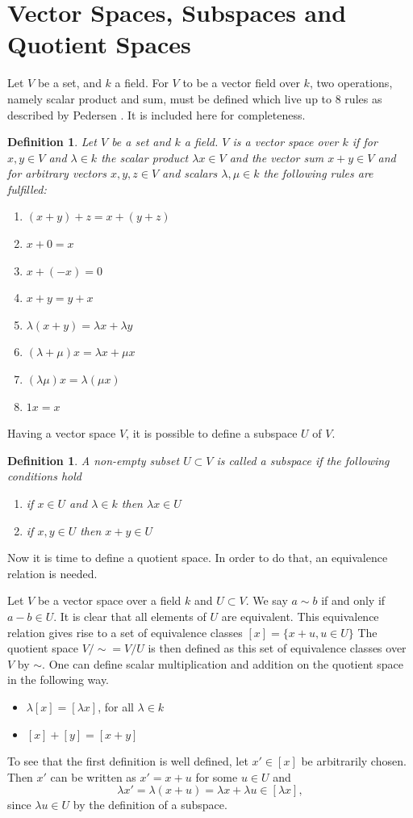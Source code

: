 \documentclass[11pt,a4paper,twoside]{report}
\newtheorem{mydef}[mythm]{Definition}
\begin{document}
\section{Vector Spaces, Subspaces and Quotient Spaces}
Let $V$ be a set, and $k$ a field. For $V$ to be a vector field over $k$, two operations, namely scalar product and sum, must be defined which live up to 8 rules as described by Pedersen \cite[pp. 85-86]{LinAlg}. It is included here for completeness.
\begin{mydef} 
Let $V$ be a set and $k$ a field. $V$ is a vector space over $k$ if for $x,y\in V$ and $\lambda\in k$ the scalar product $\lambda x\in V$ and the vector sum $x+y\in V$ and for arbitrary vectors $x,y,z\in V$ and scalars $\lambda,\mu\in k$ the following rules are fulfilled:
\begin{enumerate}
\item $(x+y)+z = x+(y+z)$
\item $x+0=x$
\item $x+(-x)=0$
\item $x+y=y+x$
\item $\lambda(x+y)=\lambda x+\lambda y$
\item $(\lambda+\mu)x=\lambda x + \mu x$
\item $(\lambda\mu)x=\lambda(\mu x)$
\item $1x=x$
\end{enumerate}
\end{mydef}
Having a vector space $V$, it is possible to define a subspace $U$ of $V$.\cite[p.93]{LinAlg}
\begin{mydef}
A non-empty subset $U\subset V$ is called a subspace if the following conditions hold
\begin{enumerate}
\item if $x\in U$ and $\lambda\in k$ then $\lambda x\in U$
\item if $x,y\in U$ then $x+y\in U$
\end{enumerate} 
\end{mydef}
Now it is time to define a quotient space. In order to do that, an equivalence relation is needed. 

Let $V$ be a vector space over a field $k$ and $U\subset V$. We say $a\sim b$ if and only if $a-b\in U$. It is clear that all elements of $U$ are equivalent.
This equivalence relation gives rise to a set of equivalence classes $[x]=\{x+u,u\in U\}$
The quotient space $V/\sim = V/U$ is then defined as this set of equivalence classes over $V$ by $\sim$.
One can define scalar multiplication and addition on the quotient space in the following way. \cite{wikiQuo}
\begin{itemize}
\item $\lambda[x]=[\lambda x]$, for all $\lambda\in k$
\item $[x]+[y]=[x+y]$
\end{itemize}
To see that the first definition is well defined, let $x'\in[x]$ be arbitrarily chosen. Then $x'$ can be written as $x'=x+u$ for some $u\in U$ and 
\begin{equation*}
\lambda x' = \lambda (x + u) = \lambda x + \lambda u \in [\lambda x],
\end{equation*}
since $\lambda u \in U$ by the definition of a subspace.
\end{document}

